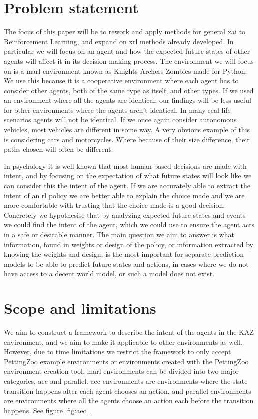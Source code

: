 \documentclass[UKenglish]{uiomasterthesis}
\begin{document}
\section{Problem statement}
\label{sec:problem}
The focus of this paper will be to rework and apply methods for general \ac{xai} to Reinforcement Learning, and expand on \ac{xrl} methods already developed. In particular we will focus on an agent and how the expected future states of other agents will affect it in its decision making process. The environment we will focus on is a \ac{marl} environment known as Knights Archers Zombies \cite{KAZ} made for Python. We use this because it is a cooperative environment where each agent has to consider other agents, both of the same type as itself, and other types. If we used an environment where all the agents are identical, our findings will be less useful for other environments where the agents aren't identical. In many real life scenarios agents will not be identical. If we once again consider autonomous vehicles, most vehicles are different in some way. A very obvious example of this is considering cars and motorcycles. Where because of their size difference, their paths chosen will often be different.

In psychology it is well known that most human based decisions are made with intent\cite{inbook}, and by focusing on the expectation of what future states will look like we can consider this the intent of the agent. If we are accurately able to extract the intent of an \ac{rl} policy we are better able to explain the choice made and we are more comfortable with trusting that the choice made is a good decision. Concretely we hypothesise that by analyzing expected future states and events we could find the intent of the agent, which we could use to ensure the agent acts in a safe or desirable manner. The main question we aim to answer is what information, found in weights or design of the policy, or information extracted by knowing the weights and design, is the most important for separate prediction models to be able to predict future states and actions, in cases where we do not have access to a decent world model, or such a model does not exist.


\section{Scope and limitations}
We aim to construct a framework to describe the intent of the agents in the KAZ environment, and we aim to make it applicable to other environments as well. However, due to time limitations we restrict the framework to only accept PettingZoo example environments or environments created with the PettingZoo environment creation tool. \ac{marl} environments can be divided into two major categories, \ac{aec} and parallel. \ac{aec} environments are environments where the state transition happens after each agent chooses an action, and parallel environments are environments where all the agents choose an action each before the transition happens. See figure \ref{fig:aec}.
\end{document}
